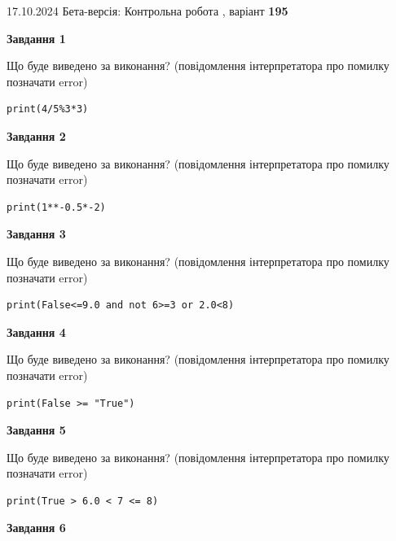 \documentclass[12pt, ukrainian]{article}
\begin{document}
{\Large{17.10.2024 Бета-версія: Контрольна робота , варіант  \No \textbf { 195 }\par}}
{
\begin {large}
{\begin {center}\textbf{Завдання 1}\end {center}}

Що буде виведено за виконання? (повідомлення інтерпретатора про помилку позначати error)\par
\begin{verbatim}
print(4/5%3*3)
\end{verbatim}

{\begin {center}\textbf{Завдання 2}\end {center}}

Що буде виведено за виконання? (повідомлення інтерпретатора про помилку позначати error)\par
\begin{verbatim}
print(1**-0.5*-2)
\end{verbatim}

{\begin {center}\textbf{Завдання 3}\end {center}}

Що буде виведено за виконання? (повідомлення інтерпретатора про помилку позначати error)\par
\begin{verbatim}
print(False<=9.0 and not 6>=3 or 2.0<8)
\end{verbatim}

{\begin {center}\textbf{Завдання 4}\end {center}}

Що буде виведено за виконання? (повідомлення інтерпретатора про помилку позначати error)\par
\begin{verbatim}
print(False >= "True")
\end{verbatim}

{\begin {center}\textbf{Завдання 5}\end {center}}

Що буде виведено за виконання? (повідомлення інтерпретатора про помилку позначати error)\par
\begin{verbatim}
print(True > 6.0 < 7 <= 8)
\end{verbatim}

{\begin {center}\textbf{Завдання 6}\end {center}}


\end{large}}
\end{document}
